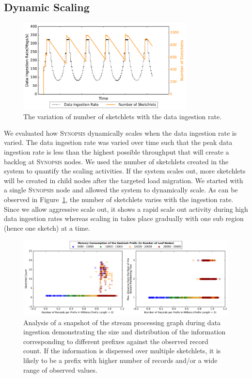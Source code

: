 \subsection{Dynamic Scaling}
\begin{figure}
    \centerline{\includegraphics[width=3.5in]{figures/dyn-scaling.pdf}}
    \caption{The variation of number of sketchlets with the data ingestion rate.}
    \label{fig:dyn-scaling}
\end{figure}
We evaluated how \textsc{Synopsis} dynamically scales when the data ingestion rate is varied.
The data ingestion rate was varied over time such that the peak data ingestion rate is less than the highest possible throughput that will create a backlog at \textsc{Synopsis} nodes.
We used the number of sketchlets created in the system to quantify the scaling activities.
If the system scales out, more sketchlets will be created in child nodes after the targeted load migration.
We started with a single \textsc{Synopsis} node and allowed the system to dynamically scale.
As can be observed in Figure~\ref{fig:dyn-scaling}, the number of sketchlets varies with the ingestion rate.
Since we allow aggressive scale out, it shows a rapid scale out activity during high data ingestion rates whereas scaling in takes place gradually with one sub region (hence one sketch) at a time.
\begin{figure}[h!]
    \centerline{\includegraphics[width=\linewidth]{figures/scaleout_graph_analysis.pdf}}
    \caption{Analysis of a snapshot of the stream processing graph during data ingestion demonstrating the size and distribution of the information corresponding to different prefixes against the observed record count. If the information is dispersed over multiple sketchlets, it is likely to be a prefix with higher number of records and/or a wide range of observed values.}
    \label{fig:scaleout-graph-analysis}
\end{figure}


